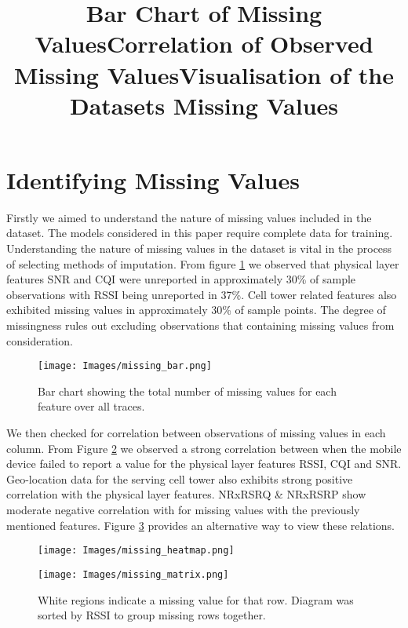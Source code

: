 \section{Identifying Missing Values}
Firstly we aimed to understand the nature of missing values included in the dataset. The models considered in this paper require complete data for training. Understanding the nature of missing values in the dataset is vital in the process of selecting methods of imputation\cite{DONDERS20061087}. From figure \ref{fig:missing_bar} we observed that physical layer features SNR and CQI were unreported in approximately 30\% of sample observations with RSSI being unreported in 37\%. Cell tower related features also exhibited missing values in approximately 30\% of sample points. The degree of missingness  rules out excluding observations that containing missing values from consideration.

\begin{figure}[h]
\texttt{[image: Images/missing\_bar.png]}
\centering
\title{Bar Chart of Missing Values}
\caption{Bar chart showing the total number of missing values for each feature over all traces.}
\label{fig:missing_bar}
\end{figure}

We then checked for correlation between observations of missing values in each column. From Figure \ref{fig:missing_heatmap} we observed a strong correlation between when the mobile device failed to report a value for the physical layer features RSSI, CQI and SNR. Geo-location data for the serving cell tower also exhibits strong positive correlation with the physical layer features. NRxRSRQ \& NRxRSRP show moderate negative correlation with for missing values with the previously mentioned features. Figure \ref{fig:missing_matrix} provides an alternative way to view these relations.

\begin{figure}[h]
\texttt{[image: Images/missing\_heatmap.png]}
\centering
\title{Correlation of Observed Missing Values}
\caption{}
\label{fig:missing_heatmap}
\end{figure}


\begin{figure}[h]
\texttt{[image: Images/missing\_matrix.png]}
\centering
\title{Visualisation of the Datasets Missing Values}
\caption{White regions indicate a missing value for that row. Diagram was sorted by RSSI to group missing rows together.}
\label{fig:missing_matrix}
\end{figure}

